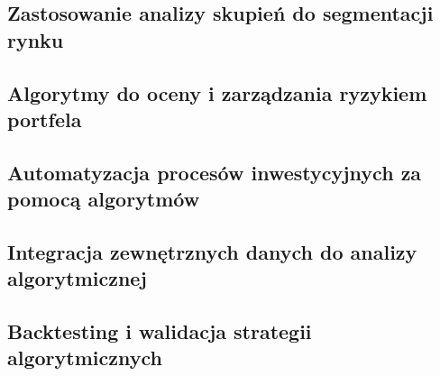 \subsection{Zastosowanie analizy skupień do segmentacji rynku}
\label{subsec:analiza-skupien-segmentacja}

\subsection{Algorytmy do oceny i zarządzania ryzykiem portfela}
\label{subsec:algorytmy-do-oceny-ryzyka}

\subsection{Automatyzacja procesów inwestycyjnych za pomocą algorytmów}
\label{subsec:automatyzacja-procesow-inwestycyjnych}

\subsection{Integracja zewnętrznych danych do analizy algorytmicznej}
\label{subsec:integracja-zewnetrznych-danych}

\subsection{Backtesting i walidacja strategii algorytmicznych}
\label{subsec:backtesting-i-walidacja-strategii}
